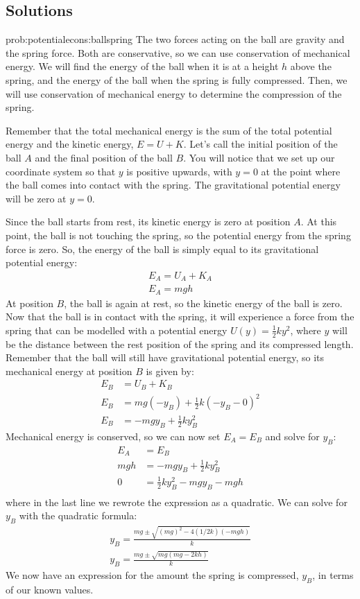 \newpage
\subsection{Solutions}
\begin{solution}{prob:potentialecons:ballspring}\label{soln:potentialecons:ballspring}
The two forces acting on the ball are gravity and the spring force. Both are conservative, so we can use conservation of mechanical energy. We will find the energy of the ball when it is at a height $h$ above the spring, and the energy of the ball when the spring is fully compressed. Then, we will use conservation of mechanical energy to determine the compression of the spring.

Remember that the total mechanical energy is the sum of the total potential energy and the kinetic energy, $E=U+K$. Let's call the initial position of the ball $A$ and the final position of the ball $B$. You will notice that we set up our coordinate system so that $y$ is positive upwards, with $y=0$ at the point where the ball comes into contact with the spring. The gravitational potential energy will be zero at $y=0$. 

Since the ball starts from rest, its kinetic energy is zero at position $A$. At this point, the ball is not touching the spring, so the potential energy from the spring force is zero. So, the energy of the ball is simply equal to its gravitational potential energy:
\begin{align*}
E_A=U_A+K_A\\
E_A=mgh
\end{align*}
At position $B$, the ball is again at rest, so the kinetic energy of the ball is zero. Now that the ball is in contact with the spring, it will experience a force from the spring that can be modelled with a potential energy $U(y)=\frac{1}{2}ky^2$, where $y$ will be the distance between the rest position of the spring and its compressed length. Remember that the ball will still have gravitational potential energy, so its mechanical energy at position $B$ is given by:
\begin{align*}
E_B&=U_B+K_B\\
E_B&=mg(-y_B)+\frac{1}{2}k(-y_B-0)^2\\
E_B&=-mgy_B+\frac{1}{2}ky_B^2
\end{align*}
Mechanical energy is conserved, so we can now set $E_A=E_B$ and solve for $y_B$:
\begin{align*}
E_A&=E_B\\
mgh&=-mgy_B+\frac{1}{2}ky_B^2\\
0&=\frac{1}{2}ky_B^2-mgy_B-mgh\\
\end{align*}
where in the last line we rewrote the expression as a quadratic. We can solve for $y_B$ with the quadratic formula:
\begin{align*}
y_B=\frac{mg\pm\sqrt{(mg)^2-4(1/2k)(-mgh)}}{k}\\
y_B=\frac{mg\pm\sqrt{mg(mg-2kh)}}{k}
\end{align*}
We now have an expression for the amount the spring is compressed, $y_B$, in terms of our known values. 
\end{solution}

